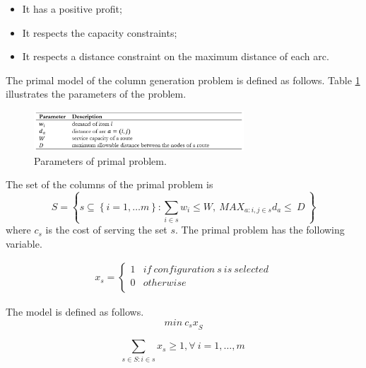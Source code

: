 \begin{itemize}
    \item It has a positive profit;
    \item It respects the capacity constraints;
    \item It respects a distance constraint on the maximum distance of each arc.
\end{itemize}

The primal model of the column generation problem is defined as follows. Table \ref{tab_CG_dist} illustrates the parameters of the problem.

\begin{figure}[hbt!]
\centering
\includegraphics[width=0.7\textwidth]{SectionDistribution/design_figures/tab_CG_dist.png}
\captionsetup{type=table}
\caption{Parameters of primal problem.}
\label{tab_CG_dist}
\end{figure}

The set of the columns of the primal problem is
\begin{equation}
    S=\left\{s\subseteq\left\{i=1,\ldots m\right\}:\sum_{i\in s}{w_i\le W},\ {MAX_{a:i,j\in s}{d}_a\le\ D}\ \right\}
\end{equation}
where $c_s$ is the cost of serving the set $s$. The primal problem has the following variable.

\begin{equation}
   \begin{split}
   x_{s}=\left\{
                \begin{array}{ll}
                  1 & if\ configuration\ s\ is\ selected \\
                  0 & otherwise\\
                \end{array}
              \right.
   \end{split}
\end{equation}

The model is defined as follows.
\begin{equation}
    min\ {c_sx}_S
\end{equation}

\begin{equation}
    \sum_{s\in S:i\in s}{x_s\geq1} , \forall\ i=1,\ldots,m\ 
\end{equation}

